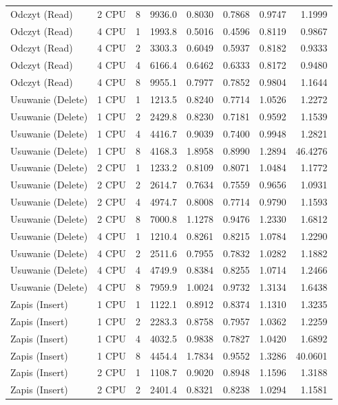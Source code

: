 \begin{table}[ht]
{\begin{tabular}{llcrrrrr}
Odczyt (Read) & 2 CPU & 8 & 9936.0 & 0.8030 & 0.7868 & 0.9747 & 1.1999 \\
Odczyt (Read) & 4 CPU & 1 & 1993.8 & 0.5016 & 0.4596 & 0.8119 & 0.9867 \\
Odczyt (Read) & 4 CPU & 2 & 3303.3 & 0.6049 & 0.5937 & 0.8182 & 0.9333 \\
Odczyt (Read) & 4 CPU & 4 & 6166.4 & 0.6462 & 0.6333 & 0.8172 & 0.9480 \\
Odczyt (Read) & 4 CPU & 8 & 9955.1 & 0.7977 & 0.7852 & 0.9804 & 1.1644 \\
Usuwanie (Delete) & 1 CPU & 1 & 1213.5 & 0.8240 & 0.7714 & 1.0526 & 1.2272 \\
Usuwanie (Delete) & 1 CPU & 2 & 2429.8 & 0.8230 & 0.7181 & 0.9592 & 1.1539 \\
Usuwanie (Delete) & 1 CPU & 4 & 4416.7 & 0.9039 & 0.7400 & 0.9948 & 1.2821 \\
Usuwanie (Delete) & 1 CPU & 8 & 4168.3 & 1.8958 & 0.8990 & 1.2894 & 46.4276 \\
Usuwanie (Delete) & 2 CPU & 1 & 1233.2 & 0.8109 & 0.8071 & 1.0484 & 1.1772 \\
Usuwanie (Delete) & 2 CPU & 2 & 2614.7 & 0.7634 & 0.7559 & 0.9656 & 1.0931 \\
Usuwanie (Delete) & 2 CPU & 4 & 4974.7 & 0.8008 & 0.7714 & 0.9790 & 1.1593 \\
Usuwanie (Delete) & 2 CPU & 8 & 7000.8 & 1.1278 & 0.9476 & 1.2330 & 1.6812 \\
Usuwanie (Delete) & 4 CPU & 1 & 1210.4 & 0.8261 & 0.8215 & 1.0784 & 1.2290 \\
Usuwanie (Delete) & 4 CPU & 2 & 2511.6 & 0.7955 & 0.7832 & 1.0282 & 1.1882 \\
Usuwanie (Delete) & 4 CPU & 4 & 4749.9 & 0.8384 & 0.8255 & 1.0714 & 1.2466 \\
Usuwanie (Delete) & 4 CPU & 8 & 7959.9 & 1.0024 & 0.9732 & 1.3134 & 1.6438 \\
Zapis (Insert) & 1 CPU & 1 & 1122.1 & 0.8912 & 0.8374 & 1.1310 & 1.3235 \\
Zapis (Insert) & 1 CPU & 2 & 2283.3 & 0.8758 & 0.7957 & 1.0362 & 1.2259 \\
Zapis (Insert) & 1 CPU & 4 & 4032.5 & 0.9838 & 0.7827 & 1.0420 & 1.6892 \\
Zapis (Insert) & 1 CPU & 8 & 4454.4 & 1.7834 & 0.9552 & 1.3286 & 40.0601 \\
Zapis (Insert) & 2 CPU & 1 & 1108.7 & 0.9020 & 0.8948 & 1.1596 & 1.3188 \\
Zapis (Insert) & 2 CPU & 2 & 2401.4 & 0.8321 & 0.8238 & 1.0294 & 1.1581 \\

\end{tabular}}
\end{table}
